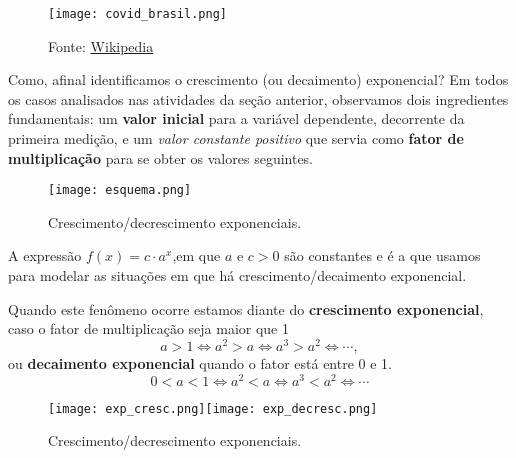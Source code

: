 \begin{figure}[H]
\centering
\texttt{[image: covid\_brasil.png]}
\caption{Fonte: \href{https://pt.wikipedia.org/wiki/Ficheiro:Casos_acumulados_de_COVID-19_no_Brasil.svg}{Wikipedia}}

\end{figure}

Como, afinal identificamos o crescimento (ou decaimento) exponencial? Em todos os casos analisados nas atividades da seção anterior, observamos dois ingredientes fundamentais: um \textbf{valor inicial} para a variável dependente, decorrente da primeira medição, e um \textit{valor constante positivo} que servia como \textbf{fator de multiplicação} para se obter os valores seguintes.

\begin{figure}[H]
\centering
\texttt{[image: esquema.png]}
\caption{Crescimento/decrescimento exponenciais.}
\end{figure}

A expressão $f(x)=c\cdot a^{x}$,em que $a$ e $c>0$ são constantes e  é a que usamos para modelar as situações em que há crescimento/decaimento exponencial.

Quando este fenômeno ocorre estamos diante do \textbf{crescimento exponencial}, caso o fator de multiplicação seja maior que 1
\[
a > 1 \Longleftrightarrow a^{2} > a \Longleftrightarrow  a^{3} > a^{2} \Longleftrightarrow \cdots,
\]
ou \textbf{decaimento exponencial} quando o fator está entre 0 e 1.
\[
0< a < 1 \Longleftrightarrow a^{2} < a \Longleftrightarrow  a^{3} < a^{2} \Longleftrightarrow \cdots
\]

\begin{figure}[H]
\centering
\texttt{[image: exp\_cresc.png]}\texttt{[image: exp\_decresc.png]}
\caption{Crescimento/decrescimento exponenciais.}
\end{figure}

